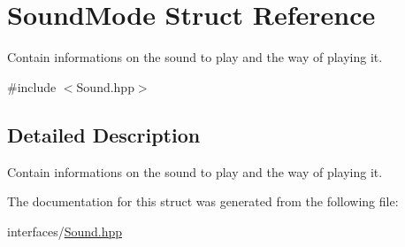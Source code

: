 \hypertarget{struct_sound_mode}{\section{Sound\-Mode Struct Reference}
\label{struct_sound_mode}
}


Contain informations on the sound to play and the way of playing it.  




{\ttfamily \#include $<$Sound.\-hpp$>$}



\subsection{Detailed Description}
Contain informations on the sound to play and the way of playing it. 

The documentation for this struct was generated from the following file\-:\begin{DoxyCompactItemize}
\item 
interfaces/\hyperlink{interfaces_2_sound_8hpp}{Sound.\-hpp}\end{DoxyCompactItemize}
